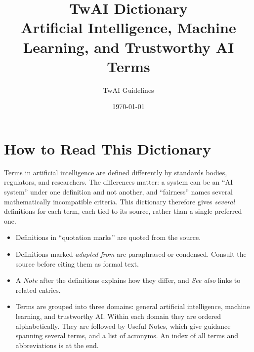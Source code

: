 \documentclass[11pt,a4paper]{article}
\title{TwAI Dictionary\\[4pt]
  \large Artificial Intelligence, Machine Learning, and Trustworthy AI Terms}
\author{TwAI Guidelines}
\date{\today}
\begin{document}
\pagestyle{empty}
\maketitle
\thispagestyle{empty}

\section*{How to Read This Dictionary}

Terms in artificial intelligence are defined differently by standards bodies,
regulators, and researchers. The differences matter: a system can be an
\enquote{AI system} under one definition and not another, and
\enquote{fairness} names several mathematically incompatible criteria. This
dictionary therefore gives \emph{several} definitions for each term, each tied
to its source, rather than a single preferred one.

\begin{itemize}[itemsep=2pt]
  \item Definitions in \enquote{quotation marks} are quoted from the source.
  \item Definitions marked \emph{adapted from} are paraphrased or condensed.
        Consult the source before citing them as formal text.
  \item A \emph{Note} after the definitions explains how they differ, and
        \emph{See also} links to related entries.
  \item Terms are grouped into three domains: general artificial intelligence,
        machine learning, and trustworthy AI. Within each domain they are
        ordered alphabetically. They are followed by Useful Notes, which
        give guidance spanning several terms, and a list of acronyms. An
        index of all terms and abbreviations is at the end.
\end{itemize}

\tableofcontents

\clearpage
\pagestyle{fancy}







\clearpage
{}
\printbibliography[heading=bibintoc,title=Sources]

\clearpage
{}
\printindex
\end{document}
